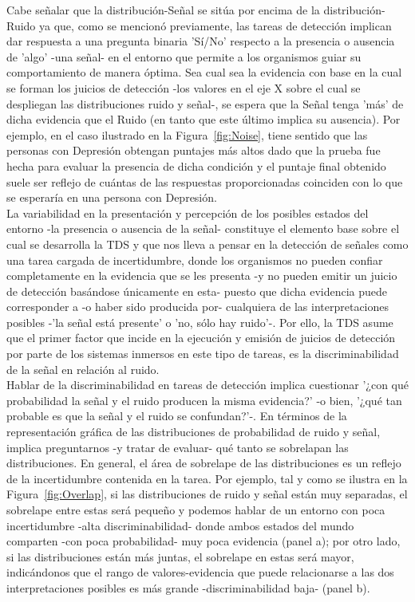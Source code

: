 Cabe señalar que la distribución-Señal se sitúa por encima de la distribución-Ruido ya que, como se mencionó previamente, las tareas de detección implican dar respuesta a una pregunta binaria 'Sí/No' respecto a la presencia o ausencia de 'algo' -una señal- en el entorno que permite a los organismos guiar su comportamiento de manera óptima. Sea cual sea la evidencia con base en la cual se forman los juicios de detección -los valores en el eje X sobre el cual se despliegan las distribuciones ruido y señal-, se espera que la Señal tenga 'más' de dicha evidencia que el Ruido (en tanto que este último implica su ausencia). Por ejemplo, en el caso ilustrado en la Figura~\ref{fig:Noise}, tiene sentido que las personas con Depresión obtengan puntajes más altos dado que la prueba fue hecha para evaluar la presencia de dicha condición y el puntaje final obtenido suele ser reflejo de cuántas de las respuestas proporcionadas coinciden con lo que se esperaría en una persona con Depresión.\\

La variabilidad en la presentación y percepción de los posibles estados del entorno -la presencia o ausencia de la señal- constituye el elemento base sobre el cual se desarrolla la TDS y que nos lleva a pensar en la detección de señales como una tarea cargada de incertidumbre, donde los organismos no pueden confiar completamente en la evidencia que se les presenta -y no pueden emitir un juicio de detección basándose únicamente en esta- puesto que dicha evidencia puede corresponder a -o haber sido producida por- cualquiera de las interpretaciones posibles -'la señal está presente' o 'no, sólo hay ruido'-. Por ello, la TDS asume que el primer factor que incide en la ejecución y emisión de juicios de detección por parte de los sistemas inmersos en este tipo de tareas, es la discriminabilidad de la señal en relación al ruido.\\

Hablar de la discriminabilidad en tareas de detección implica cuestionar '¿con qué probabilidad la señal y el ruido producen la misma evidencia?' -o bien, '¿qué tan probable es que la señal y el ruido se confundan?'-. En términos de la representación gráfica de las distribuciones de probabilidad de ruido y señal, implica preguntarnos -y tratar de evaluar- qué tanto se sobrelapan las distribuciones. En general, el área de sobrelape de las distribuciones es un reflejo de la incertidumbre contenida en la tarea. Por ejemplo, tal y como se ilustra en la Figura~\ref{fig:Overlap}, si las distribuciones de ruido y señal están muy separadas, el sobrelape entre estas será pequeño y podemos hablar de un entorno con poca incertidumbre -alta discriminabilidad- donde ambos estados del mundo comparten -con poca probabilidad- muy poca evidencia (panel a); por otro lado, si las distribuciones están más juntas, el sobrelape en estas será mayor, indicándonos que el rango de valores-evidencia que puede relacionarse a las dos interpretaciones posibles es más grande -discriminabilidad baja- (panel b).\\

